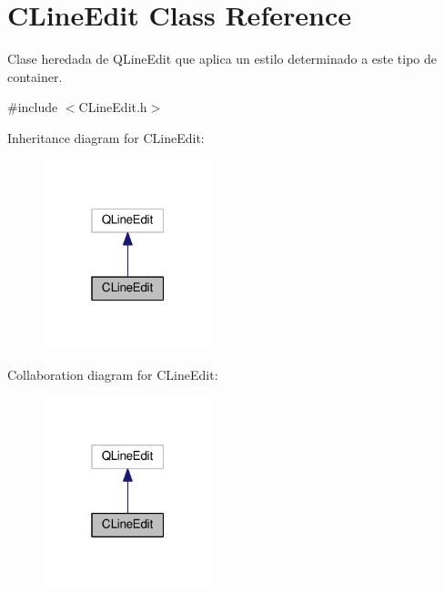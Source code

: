 \hypertarget{classCLineEdit}{}\section{C\+Line\+Edit Class Reference}
\label{classCLineEdit}


Clase heredada de \textquotesingle{}Q\+Line\+Edit\textquotesingle{} que aplica un estilo determinado a este tipo de container.  




{\ttfamily \#include $<$C\+Line\+Edit.\+h$>$}



Inheritance diagram for C\+Line\+Edit\+:
\nopagebreak
\begin{figure}[H]
\begin{center}
\leavevmode
\includegraphics[width=139pt]{classCLineEdit__inherit__graph}
\end{center}
\end{figure}


Collaboration diagram for C\+Line\+Edit\+:
\nopagebreak
\begin{figure}[H]
\begin{center}
\leavevmode
\includegraphics[width=139pt]{classCLineEdit__coll__graph}
\end{center}
\end{figure}

